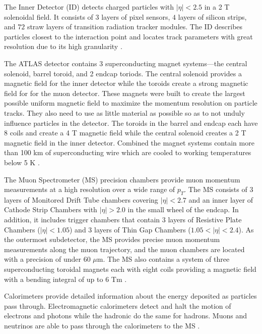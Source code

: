 The Inner Detector (ID) detects charged particles with $|\eta| < 2.5$ in a 2 T solenoidal field. It consists of $3$ layers of pixel sensors, $4$ layers of silicon strips, and $72$ straw layers of transition radiation tracker modules. The ID describes particles closest to the interaction point and locates track parameters with great resolution due to its high granularity \cite{detector}. 

The ATLAS detector contains 3 superconducting magnet systems---the central solenoid, barrel toroid, and 2 endcap toriods. The central solenoid provides a magnetic field for the inner detector while the toroids create a strong magnetic field for for the muon detector. These magnets were built to create the largest possible uniform magnetic field to maximize the momentum resolution on particle tracks. They also need to use as little material as possible so as to not unduly influence particles in the detector. The toroids in the barrel and endcap each have 8 coils and create a 4 T magnetic field while the central solenoid creates a 2 T magnetic field in the inner detector. Combined the magnet systems contain more than 100 km of superconducting wire which are cooled to working temperatures below 5 K \cite{detector}. 

The Muon Spectrometer (MS) precision chambers provide muon momentum measurements at a high resolution over a wide range of $p_T$. The MS consists of $3$ layers of Monitored Drift Tube chambers covering $|\eta| < 2.7$ and an inner layer of Cathode Strip Chambers with $|\eta| > 2.0$ in the small wheel of the endcap. In addition, it includes trigger chambers that contain $3$ layers of Resistive Plate Chambers ($|\eta| < 1.05$) and $3$ layers of Thin Gap Chambers ($1.05 < |\eta| < 2.4$). As the outermost subdetector, the MS provides precise muon momentum measurements along the muon trajectory, and the muon chambers are located with a precision of under $60$ $\mu$m. The MS also contains a system of three superconducting toroidal magnets each with eight coils providing a magnetic field with a bending integral of up to $6$ Tm \cite{detector}. 

Calorimeters provide detailed information about the energy deposited as particles pass through. Electromagnetic calorimeters detect and halt the motion of electrons and photons while the hadronic do the same for hadrons. Muons and neutrinos are able to pass through the calorimeters to the MS \cite{detector}. 

